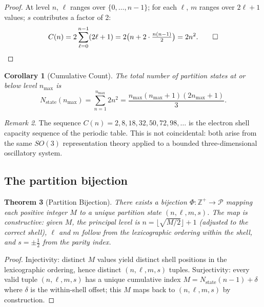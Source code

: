 \documentclass[twocolumn,10pt,a4paper]{article}
\theoremstyle{thmstyle}
\newtheorem{theorem}{Theorem}[section]
\newtheorem{corollary}[theorem]{Corollary}
\theoremstyle{definition}
\theoremstyle{remark}
\newtheorem{remark}[theorem]{Remark}
\newcommand{\Zp}{\mathbb{Z}^{+}}
\newcommand{\Parts}{\mathcal{P}}
\begin{document}
\begin{proof}
At level $n$, $\ell$ ranges over $\{0,\ldots,n-1\}$; for each $\ell$,
$m$ ranges over $2\ell+1$ values; $s$ contributes a factor of 2:
\begin{align}
C(n) = 2\sum_{\ell=0}^{n-1}(2\ell+1) = 2\bigl(n + 2\cdot\tfrac{n(n-1)}{2}\bigr)
= 2n^2.\qed
\end{align}
\end{proof}

\begin{corollary}[Cumulative Count]
The total number of partition states at or below level $n_{\max}$ is
\begin{equation}
N_{\mathrm{state}}(n_{\max}) = \sum_{n=1}^{n_{\max}} 2n^2
= \frac{n_{\max}(n_{\max}+1)(2n_{\max}+1)}{3}.
\end{equation}
\end{corollary}

\begin{remark}
The sequence $C(n) = 2, 8, 18, 32, 50, 72, 98, \ldots$ is the electron
shell capacity sequence of the periodic table. This is not coincidental:
both arise from the same $SO(3)$ representation theory applied to a bounded
three-dimensional oscillatory system.
\end{remark}

\subsection{The partition bijection}

\begin{theorem}[Partition Bijection]
\label{thm:bijection}
There exists a bijection $\Phi : \Zp \to \Parts$ mapping each positive integer
$M$ to a unique partition state $(n,\ell,m,s)$. The map is constructive:
given $M$, the principal level is $n = \lfloor\sqrt{M/2}\rfloor + 1$
(adjusted to the correct shell), $\ell$ and $m$ follow from the lexicographic
ordering within the shell, and $s = \pm\tfrac12$ from the parity index.
\end{theorem}

\begin{proof}
Injectivity: distinct $M$ values yield distinct shell positions in the
lexicographic ordering, hence distinct $(n,\ell,m,s)$ tuples.
Surjectivity: every valid tuple $(n,\ell,m,s)$ has a unique cumulative index
$M = N_{\mathrm{state}}(n-1) + \delta$ where $\delta$ is the within-shell
offset; this $M$ maps back to $(n,\ell,m,s)$ by construction.
\end{proof}
\end{document}
